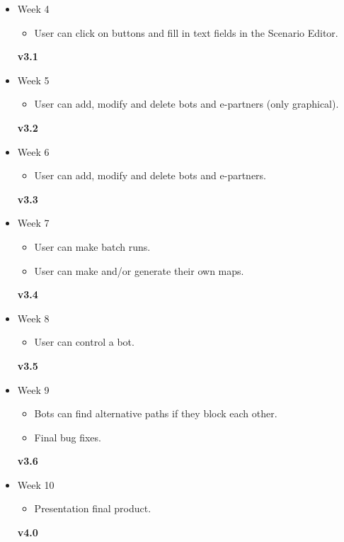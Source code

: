 \begin{description}
\begin{itemize}
	\item Week 4
	\begin{itemize}
		\item User can click on buttons and fill in text fields in the Scenario Editor.
	\end{itemize}
	\textbf{v3.1}
	\item Week 5
	\begin{itemize}
		\item User can add, modify and delete bots and e-partners (only graphical).
	\end{itemize}
	\textbf{v3.2}
	\item Week 6
	\begin{itemize}
		\item User can add, modify and delete bots and e-partners.
	\end{itemize}
	\textbf{v3.3}
	\item Week 7
	\begin{itemize}
		\item User can make batch runs.
		\item User can make and/or generate their own maps.
	\end{itemize}
	\textbf{v3.4}
	\item Week 8
	\begin{itemize}
		\item User can control a bot.
	\end{itemize}
	\textbf{v3.5}
	\item Week 9 
	\begin{itemize}
		\item Bots can find alternative paths if they block each other.
		\item Final bug fixes.
	\end{itemize}
	\textbf{v3.6}
	\item Week 10 
	\begin{itemize}
		\item Presentation final product.
	\end{itemize}
	\textbf{v4.0}
\end{itemize}

\end{description}
